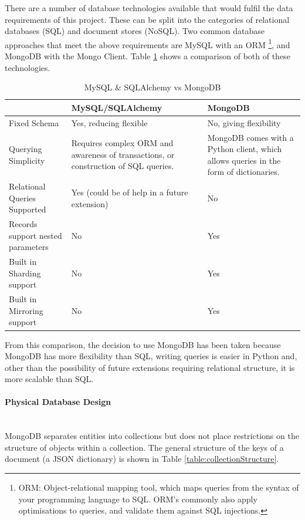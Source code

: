 \documentclass{article}
\newcommand{\myparagraph}[1]{\paragraph{#1}\mbox{}\\}
\begin{document}
There are a number of database technologies available that would fulfil the data requirements of this project.  These can be split into the categories of relational databases (SQL) and document stores (NoSQL).  Two common database approaches that meet the above requirements are MySQL with an ORM \footnote{ORM: Object-relational mapping tool, which maps queries from the syntax of your programming language to SQL.  ORM's commonly also apply optimisations to queries, and validate them against SQL injections.}, and MongoDB with the Mongo Client.  Table \ref{table:mysqlVsMongo} shows a comparison of both of these technologies.

\begin{table}
\begin{center}
    \begin{tabular}{| p{3.8cm} | p{4.0cm} | p{4.6cm} |}
    \hline
     & MySQL/SQLAlchemy & MongoDB \\ \hline
    Fixed Schema & Yes, reducing flexible & No, giving flexibility \\ \hline
    Querying Simplicity & Requires complex ORM and awareness of transactions, or construction of SQL queries. & MongoDB comes with a Python client, which allows queries in the form of dictionaries. \\ \hline
    Relational Queries Supported & Yes (could be of help in a future extension) & No \\ \hline
    Records support nested parameters & No & Yes \\ \hline
    Built in Sharding support & No & Yes \\ \hline
    Built in Mirroring support & No & Yes \\ \hline
    \end{tabular}
    \caption{MySQL \& SQLAlchemy vs MongoDB}
    \label{table:mysqlVsMongo}
\end{center}
\end{table}

From this comparison, the decision to use MongoDB has been taken because MongoDB has more flexibility than SQL, writing queries is easier in Python and, other than the possibility of future extensions requiring relational structure, it is more scalable than SQL.

\myparagraph{Physical Database Design}
MongoDB separates entities into collections but does not place restrictions on the structure of objects within a collection.  The general structure of the keys of a document (a JSON dictionary) is shown in Table \ref{table:collectionStructure}.
\end{document}
